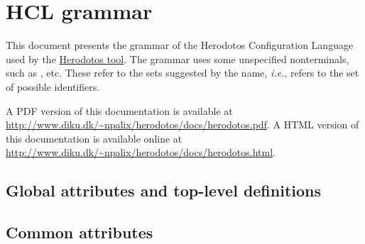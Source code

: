 
\chapter{HCL grammar}
\label{sec:hcl-grammar}

This document presents the grammar of the Herodotos Configuration
Language used by the
\href{http://www.diku.dk/~npalix/herodotos/}{Herodotos tool}.  The
grammar uses some unspecified nonterminals, such as , etc.
These refer to the sets suggested by the name, {\em i.e.}, 
refers to the set of possible identifiers.

\ifhevea
A PDF version of this documentation is available at
\url{http://www.diku.dk/~npalix/herodotos/docs/herodotos.pdf}.
\else
A HTML version of this documentation is available online at
\url{http://www.diku.dk/~npalix/herodotos/docs/herodotos.html}.
\fi

\section{Global attributes and top-level definitions}
\label{sec:globattr}

  \begin{grammar}





  \end{grammar}

\section{Common attributes}
\label{sec:commonattr}

  \begin{grammar}
  \end{grammar}

